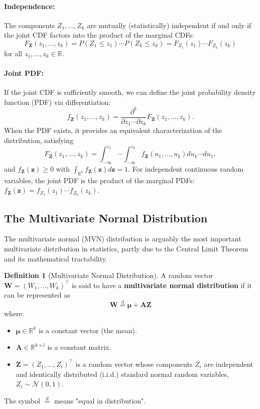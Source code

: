 \documentclass[11pt, letterpaper]{article}
\theoremstyle{plain} %
\theoremstyle{definition} %
\newtheorem{definition}[theorem]{Definition}
\theoremstyle{remark} %
\newcommand{\R}{\mathbb{R}}
\newcommand{\Normal}{\mathcal{N}}
\begin{document}
\paragraph{Independence:} The components $Z_1, \ldots, Z_k$ are mutually (statistically) independent if and only if the joint CDF factors into the product of the marginal CDFs:
\[ F_{\boldsymbol{Z}}(z_1, \ldots, z_k) = P(Z_1 \le z_1) \cdots P(Z_k \le z_k) = F_{Z_1}(z_1) \cdots F_{Z_k}(z_k) \]
for all $z_1, \ldots, z_k \in \R$.

\paragraph{Joint PDF:} If the joint CDF is sufficiently smooth, we can define the joint probability density function (PDF) via differentiation:
\[ f_{\boldsymbol{Z}}(z_1, \ldots, z_k) = \frac{\partial^k}{\partial z_1 \cdots \partial z_k} F_{\boldsymbol{Z}}(z_1, \ldots, z_k). \]
When the PDF exists, it provides an equivalent characterization of the distribution, satisfying
\[ F_{\boldsymbol{Z}}(z_1, \ldots, z_k) = \int_{-\infty}^{z_1} \cdots \int_{-\infty}^{z_k} f_{\boldsymbol{Z}}(u_1, \ldots, u_k) du_k \cdots du_1, \]
and $f_{\boldsymbol{Z}}(\boldsymbol{z}) \ge 0$ with $\int_{\R^k} f_{\boldsymbol{Z}}(\boldsymbol{z}) d\boldsymbol{z} = 1$. For independent continuous random variables, the joint PDF is the product of the marginal PDFs: $f_{\boldsymbol{Z}}(\boldsymbol{z}) = f_{Z_1}(z_1) \cdots f_{Z_k}(z_k)$.

\subsection{The Multivariate Normal Distribution}

The multivariate normal (MVN) distribution is arguably the most important multivariate distribution in statistics, partly due to the Central Limit Theorem and its mathematical tractability.

\begin{definition}[Multivariate Normal Distribution] \label{def:mvn}
A random vector $\boldsymbol{W} = (W_1, \ldots, W_k)^{\top}$ is said to have a \textbf{multivariate normal distribution} if it can be represented as
\begin{equation} \label{eq:mvn_representation}
\boldsymbol{W} \stackrel{d}{=} \boldsymbol{\mu} + \boldsymbol{A} \boldsymbol{Z}
\end{equation}
where:
\begin{itemize}
    \item $\boldsymbol{\mu} \in \R^k$ is a constant vector (the mean).
    \item $\boldsymbol{A} \in \R^{k \times l}$ is a constant matrix.
    \item $\boldsymbol{Z} = (Z_1, \ldots, Z_l)^{\top}$ is a random vector whose components $Z_i$ are independent and identically distributed (i.i.d.) standard normal random variables, $Z_i \sim \Normal(0, 1)$.
\end{itemize}
The symbol $\stackrel{d}{=}$ means "equal in distribution".
\end{definition}
\end{document}
